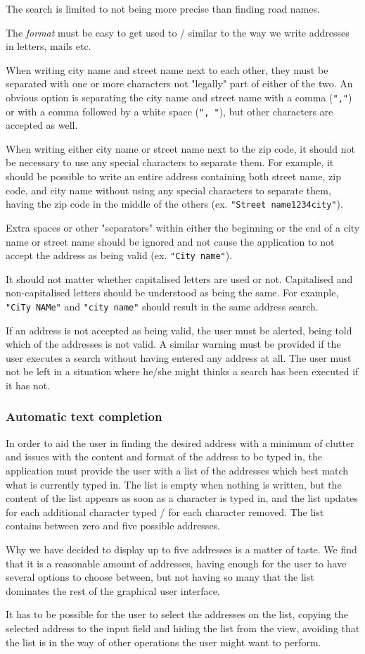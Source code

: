 The search is limited to not being more precise than finding road names.

The \textit{format} must be easy to get used to / similar to the way we write addresses in letters, mails etc.

When writing city name and street name next to each other, they must be separated with one or more characters not "legally" part of either of the two. An obvious option is separating the city name and street name with a comma (\texttt{","}) or with a comma followed by a white space (\texttt{", "}), but other characters are accepted as well.

When writing either city name or street name next to the zip code, it should not be necessary to use any special characters to separate them. For example, it should be possible to write an entire address containing both street name, zip code, and city name without using any special characters to separate them, having the zip code in the middle of the others (ex. \texttt{"Street name1234city"}).

Extra spaces or other "separators" within either the beginning or the end of a city name or street name should be ignored and not cause the application to not accept the address as being valid (ex. \texttt{"City name"}).

It should not matter whether capitalised letters are used or not. Capitalised and non-capitalised letters should be understood as being the same. For example, \texttt{"CiTy NAMe"} and \texttt{"city name"} should result in the same address search.

If an address is not accepted as being valid, the user must be alerted, being told which of the addresses is not valid. A similar warning must be provided if the user executes a search without having entered any address at all. The user must not be left in a situation where he/she might thinks a search has been executed if it has not.

\subsubsection{Automatic text completion}
In order to aid the user in finding the desired address with a minimum of clutter and issues with the content and format of the address to be typed in, the application must provide the user with a list of the addresses which best match what is currently typed in. The list is empty when nothing is written, but the content of the list appears as soon as a character is typed in, and the list updates for each additional character typed / for each character removed. The list contains between zero and five possible addresses.

Why we have decided to display up to five addresses is a matter of taste. We find that it is a reasonable amount of addresses, having enough for the user to have several options to choose between, but not having so many that the list dominates the rest of the graphical user interface.

It has to be possible for the user to select the addresses on the list, copying the selected address to the input field and hiding the list from the view, avoiding that the list is in the way of other operations the user might want to perform.
